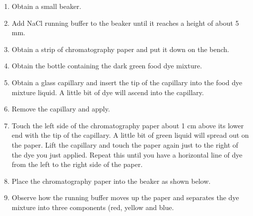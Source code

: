 \begin{enumerate}
\def\labelenumi{\arabic{enumi}.}
\tightlist
\item
  Obtain a small beaker.
\item
  Add NaCl running buffer to the beaker until it reaches a height of
  about 5 mm.
\item
  Obtain a strip of chromatography paper and put it down on the bench.
\item
  Obtain the bottle containing the dark green food dye mixture.
\item
  Obtain a glass capillary and insert the tip of the capillary into the
  food dye mixture liquid. A little bit of dye will ascend into the
  capillary.
\item
  Remove the capillary and apply.
\item
  Touch the left side of the chromatography paper about 1 cm above its
  lower end with the tip of the capillary. A little bit of green liquid
  will spread out on the paper. Lift the capillary and touch the paper
  again just to the right of the dye you just applied. Repeat this until
  you have a horizontal line of dye from the left to the right side of
  the paper.
\item
  Place the chromatography paper into the beaker as shown below.
\item
  Observe how the running buffer moves up the paper and separates the
  dye mixture into three components (red, yellow and blue.
\end{enumerate}

